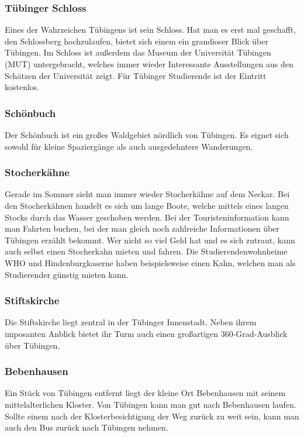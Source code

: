 \subsubsection*{Tübinger Schloss}
Eines der Wahrzeichen Tübingens ist sein Schloss. Hat man es erst mal geschafft, den Schlossberg hochzulaufen, bietet sich einem ein grandioser Blick über Tübingen. Im Schloss ist außerdem das Museum der Universität Tübingen (MUT) untergebracht, welches immer wieder Interessante Ausstellungen aus den Schätzen der Universität zeigt. Für Tübinger Studierende ist der Eintritt kostenlos.

\subsubsection*{Schönbuch}
Der Schönbuch ist ein großes Waldgebiet nördlich von Tübingen. Es eignet sich sowohl für kleine Spaziergänge als auch ausgedehntere Wanderungen.

\subsubsection*{Stocherkähne}
Gerade im Sommer sieht man immer wieder Stocherkähne auf dem Neckar. Bei den Stocherkähnen handelt es sich um lange Boote, welche mittels eines langen Stocks durch das Wasser geschoben werden. Bei der Touristeninformation kann man Fahrten buchen, bei der man gleich noch zahlreiche Informationen über Tübingen erzählt bekommt. Wer nicht so viel Geld hat und es sich zutraut, kann auch selbst einen Stocherkahn mieten und fahren. Die Studierendenwohnheime WHO und Hindenburgkaserne haben beispielsweise einen Kahn, welchen man als Studierender günstig mieten kann.

\subsubsection*{Stiftskirche}
Die Stiftskirche liegt zentral in der Tübinger Innenstadt. Neben ihrem imposanten Anblick bietet ihr Turm auch einen großartigen 360-Grad-Ausblick über Tübingen. 

\subsubsection*{Bebenhausen}
Ein Stück von Tübingen entfernt liegt der kleine Ort Bebenhausen mit seinem mittelalterlichen Kloster. Von Tübingen kann man gut nach Bebenhausen laufen. Sollte einem nach der Klosterbesichtigung der Weg zurück zu weit sein, kann man auch den Bus zurück nach Tübingen nehmen.

